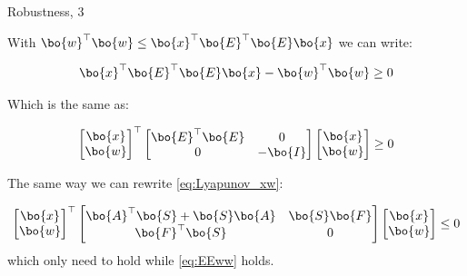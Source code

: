 \documentclass{beamer}
\begin{document}
\begin{frame}{Robustness, 3}
	\begin{flushleft}
		
		With $\bo{w}^\top \bo{w} 
		\leq
		\bo{x}^\top\bo{E}^\top \bo{E}\bo{x}$ we can write:
		
		\begin{equation}
			\bo{x}^\top\bo{E}^\top \bo{E}\bo{x} - \bo{w}^\top \bo{w} \geq 0
		\end{equation}	
		
		Which is the same as:
		
		\begin{equation}
			\label{eq:EEww}
			\begin{bmatrix}
				\bo{x} \\ \bo{w}
			\end{bmatrix}^\top
			\begin{bmatrix}
				\bo{E}^\top \bo{E} & 0 \\
				0 & -\bo{I}
			\end{bmatrix}		
			\begin{bmatrix}
				\bo{x} \\ \bo{w}
			\end{bmatrix}
			\geq 0
		\end{equation}	
		
		The same way we can rewrite \eqref{eq:Lyapunov_xw}:
		
		\begin{equation}
			\label{eq:xw_Lyapunov}
			\begin{bmatrix}
				\bo{x} \\ \bo{w}
			\end{bmatrix}^\top
			\begin{bmatrix}
				\bo{A}^\top \bo{S} + \bo{S}\bo{A} & \bo{S}\bo{F} \\
				\bo{F}^\top\bo{S} & 0
			\end{bmatrix}		
			\begin{bmatrix}
				\bo{x} \\ \bo{w}
			\end{bmatrix}
			\leq 0
		\end{equation}	
		which only need to hold while \eqref{eq:EEww} holds.
		
	\end{flushleft}
\end{frame}
\end{document}

